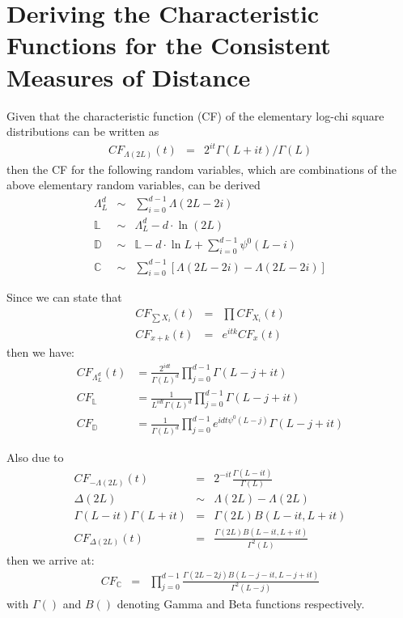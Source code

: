 \documentclass[journal]{IEEEtran}
\begin{document}
\section{Deriving the Characteristic Functions for the Consistent Measures of Distance}
\label{sec:appendix_b}

Given that the characteristic function (CF) of the elementary log-chi square distributions can be written as
\begin{eqnarray}
 CF_{\Lambda(2L)}(t) &=& 2^{it}\Gamma(L+it)/\Gamma(L) \nonumber
\end{eqnarray}
  then the CF for the following random variables,
  which are combinations of the above elementary random variables, can be derived
\begin{eqnarray*}
   \Lambda^d_L &\sim&  \sum^{d-1}_{i=0} \Lambda(2L-2i) \\
  \mathbb{L} &\sim&  \Lambda^d_L -d \cdot \ln(2L) \\
  \mathbb{D} &\sim& \mathbb{L} - d \cdot \ln{L} + \sum^{d-1}_{i=0} \psi^0(L-i) \\
  \mathbb{C} &\sim&  \sum^{d-1}_{i=0} \left[ \Lambda(2L-2i) - \Lambda(2L-2i) \right]
\end{eqnarray*}

Since we can state that
\begin{eqnarray*}
 CF_{\sum X_i}(t)   &=& \prod CF_{X_i}(t) \\
 CF_{x+k}(t) &=& e^{itk}CF_x(t)
\end{eqnarray*}
then we have:
\begin{align}
  CF_{\Lambda^d_L}(t) &= \frac{2^{idt}}{\Gamma(L)^d} \prod^{d-1}_{j=0} \Gamma(L-j+it) \\
   CF_{\mathbb{L}} &= \frac{1}{L^{idt} \Gamma(L)^d}  \prod^{d-1}_{j=0} \Gamma(L-j+it) \\
   CF_{\mathbb{D}} &= \frac{ 1 }{\Gamma(L)^d} \prod^{d-1}_{j=0} e^{idt \psi^0(L-j)} \Gamma(L-j+it)  
\end{align}

Also due to
\begin{eqnarray*}
  CF_{-\Lambda(2L)}(t) &=& 2^{-it}\frac{\Gamma(L-it)}{\Gamma(L)} \\ 
  \Delta(2L) &\sim& \Lambda(2L) - \Lambda(2L) \\
  \Gamma(L-it) \Gamma(L+it) &=&  \Gamma(2L)B(L-it,L+it) \\
   CF_{\Delta(2L)}(t) &=& \frac{\Gamma(2L)B(L-it,L+it)}{\Gamma^2(L)} 
\end{eqnarray*}
then we arrive at:
\begin{align}
  CF_{\mathbb{C}} &=&  \prod^{d-1}_{j=0} \frac{\Gamma(2L-2j)B(L-j-it,L-j+it)}{\Gamma^2(L-j)} 
\end{align}
with $\Gamma()$ and $B()$ denoting Gamma and Beta functions respectively.
\end{document}
